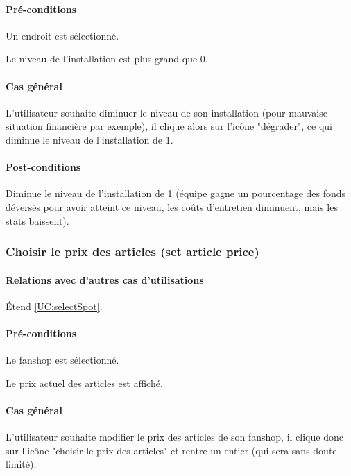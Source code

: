 \paragraph{Pré-conditions}
\begin{list}{}{\leftmargin=1.5em}
\item{Un endroit est sélectionné.}
\item{Le niveau de l'installation est plus grand que 0.}
\end{list}
\paragraph{Cas général}
L'utilisateur souhaite diminuer le niveau de son installation (pour mauvaise situation financière par exemple), il clique alors sur l'icône "dégrader", ce qui diminue le niveau de l'installation de 1. 
\paragraph{Post-conditions}
Diminue le niveau de l'installation de 1 (équipe gagne un pourcentage des fonds déversés pour avoir atteint ce niveau, les coûts d'entretien diminuent, mais les stats baissent).


\subsubsection{Choisir le prix des articles (set article price)}
\label{UC:setArticlePrice}
\paragraph{Relations avec d'autres cas d'utilisations}
Étend \ref{UC:selectSpot}.
\paragraph{Pré-conditions}
\begin{list}{}{\leftmargin=1.5em}
\item{Le fanshop est sélectionné.}
\item{Le prix actuel des articles est affiché.}
\end{list}
\paragraph{Cas général}
L'utilisateur souhaite modifier le prix des articles de son fanshop, il clique donc sur l'icône "choisir le prix des articles" et rentre un entier (qui sera sans doute limité). 
